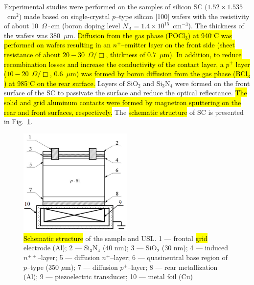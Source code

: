 \documentclass[sn-mathphys]{sn-jnl}%
\theoremstyle{thmstyleone}%
\theoremstyle{thmstyletwo}%
\theoremstyle{thmstylethree}%
\begin{document}
Experimental studies were performed on the samples of silicon SC ($1.52\times1.535$~cm$^2$) made based on single-crystal  $p$--type silicon [100] wafers with the resistivity of about 10~$\Omega\cdot$cm
(boron doping level  $N_A=1.4\times10^{15}$~cm$^{-3}$).
The thickness of the wafers was 380~$\mu$m.
\hl{ Diffusion from the gas phase (POCl$_3$) at 940$^\circ$C was performed on wafers resulting in an $n^+$--emitter layer on
the front side (sheet resistance of about $20-30$~$\Omega/\Box$, thickness of $0.7$~$\mu$m).
In addition, to reduce recombination losses and increase the conductivity of the contact layer,
a $p^+$ layer ($10-20$~$\Omega/\Box$, $0.6$~$\mu$m) was formed by boron diffusion from
the gas phase (BCl$_3$) at 985$^\circ$C on the rear surface.}
Layers of SiO$_2$ and Si$_3$N$_4$ were formed on the front surface of the SC to passivate the surface and reduce the optical reflectance.
\hl{ The solid and grid aluminum contacts were formed by magnetron sputtering on the rear and front surfaces, respectively.}
The \hl{schematic structure} of SC is presented in Fig.~\ref{figChem}.
\begin{figure}
\centering
\includegraphics[width=0.5\textwidth]{Fig1}
\caption{\hl{Schematic structure} of the sample and USL.
1 --- frontal \hl{grid} electrode (Al);
2 --- Si$_3$N$_4$ (40 nm);
3 --- SiO$_2$ (30 nm);
4 --- induced $n^{++}$--layer;
5 --- diffusion $n^+$--layer;
6 --- quasineutral base region of $p$--type (350 $\mu$m);
7 --- diffusion $p^+$--layer;
8 --- rear metallization (Al);
9 --- piezoelectric transducer;
10 --- metal foil (Cu)}
\label{figChem}       %
\end{figure}
\end{document}
